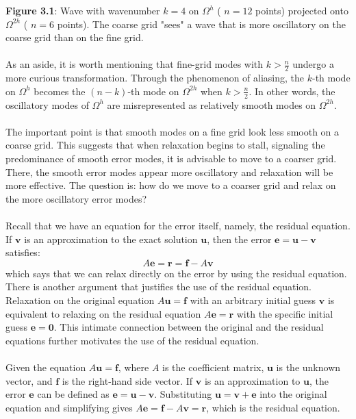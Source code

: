 \documentclass[11pt]{book}
\begin{document}
\textbf{Figure 3.1}: Wave with wavenumber $k=4$ on $\Omega^{h}$ ( $n=12$ points) projected onto $\Omega^{2 h}$ ( $n=6$ points). The coarse grid "sees" a wave that is more oscillatory on the coarse grid than on the fine grid. \\ \\
As an aside, it is worth mentioning that fine-grid modes with $k>\frac{n}{2}$ undergo a more curious transformation. Through the phenomenon of aliasing, the $k$-th mode on $\Omega^{h}$ becomes the $(n-k)$-th mode on $\Omega^{2 h}$ when $k>\frac{n}{2}$. In other words, the oscillatory modes of $\Omega^{h}$ are misrepresented as relatively smooth modes on $\Omega^{2 h}$. \\ \\
The important point is that smooth modes on a fine grid look less smooth on a coarse grid. This suggests that when relaxation begins to stall, signaling the predominance of smooth error modes, it is advisable to move to a coarser grid. There, the smooth error modes appear more oscillatory and relaxation will be more effective. The question is: how do we move to a coarser grid and relax on the more oscillatory error modes? \\ \\ 
 Recall that we have an equation for the error itself, namely, the residual equation. If $\mathbf{v}$ is an approximation to the exact solution $\mathbf{u}$, then the error $\mathbf{e}=\mathbf{u}-\mathbf{v}$ satisfies:
$$
A \mathbf{e}=\mathbf{r}=\mathbf{f}-A \mathbf{v}
$$
which says that we can relax directly on the error by using the residual equation. There is another argument that justifies the use of the residual equation.
Relaxation on the original equation $A \mathbf{u}=\mathbf{f}$ with an arbitrary initial guess $\mathbf{v}$ is equivalent to relaxing on the residual equation $A \mathbf{e}=\mathbf{r}$ with the specific initial guess $\mathbf{e}=\mathbf{0}$. This intimate connection between the original and the residual equations further motivates the use of the residual equation.\\ \\
Given the equation $A \mathbf{u} = \mathbf{f}$, where $A$ is the coefficient matrix, $\mathbf{u}$ is the unknown vector, and $\mathbf{f}$ is the right-hand side vector. If $\mathbf{v}$ is an approximation to $\mathbf{u}$, the error $\mathbf{e}$ can be defined as $\mathbf{e} = \mathbf{u} - \mathbf{v}$. Substituting $\mathbf{u} = \mathbf{v} + \mathbf{e}$ into the original equation and simplifying gives $A\mathbf{e} = \mathbf{f} - A\mathbf{v} = \mathbf{r}$, which is the residual equation.\\ \\
\end{document}

